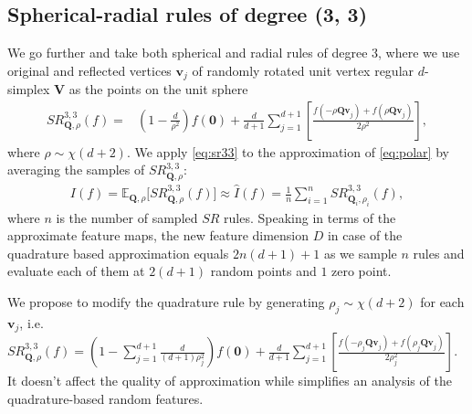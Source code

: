 \subsection{Spherical-radial rules of degree (3, 3)}
We go further and take both spherical and radial rules of degree 3, where we use original and reflected vertices $\mathbf{v}_j$ of randomly rotated unit vertex regular $d$-simplex $\mathbf{V}$ as the points on the unit sphere
\begin{equation}
\begin{split}
\label{eq:sr33}
SR^{3,3}_{\mathbf{Q}, \rho}(f) = &\left (1 - \frac{d}{\rho^2} \right )f(\mathbf{0}) + \frac{d}{d+1}\sum\limits_{j=1}^{d+1} \left[ \frac{f(-\rho \mathbf{Qv}_j) + f(\rho \mathbf{Qv}_j)}{2\rho^2} \right],
\end{split}
\end{equation}
where  ${\rho \sim \chi(d+2)}$. We apply \eqref{eq:sr33} to the approximation of \eqref{eq:polar}
by averaging the samples of $SR^{3,3}_{\mathbf{Q}, \rho}$:
\begin{equation}
\begin{split}
\label{eq:estimate}
    I(f) = \mathbb{E}_{\mathbf{Q}, \rho} \lbrack SR^{3,3}_{\mathbf{Q},\rho}(f) \rbrack \approx \hat{I}(f) = \frac{1}{n}\sum\limits_{i=1}^{n} SR^{3,3}_{\mathbf{Q}_i,\rho_i}(f),
\end{split}
\end{equation}
where $n$ is the number of sampled $SR$ rules. Speaking in terms of the approximate feature maps, the new feature dimension $D$ in case of the quadrature based approximation equals $2n(d+1) + 1$ as we sample $n$ rules and evaluate each of them at $2(d+1)$ random points and $1$ zero point.

We propose to modify the quadrature rule by generating $\rho_j \sim \chi(d + 2)$ for each $\mathbf{v}_j$, i.e.
$SR^{3,3}_{\mathbf{Q}, \rho}(f) = \left (1 - \sum_{j = 1}^{d + 1}\frac{d}{(d + 1)\rho_j^2} \right )f(\mathbf{0}) + \frac{d}{d+1}\sum\limits_{j=1}^{d+1} \left[ \frac{f(-\rho_j \mathbf{Qv}_j) + f(\rho_j \mathbf{Qv}_j)}{2\rho_j^2} \right].$
It doesn't affect the quality of approximation while simplifies an analysis
of the quadrature-based random features.

